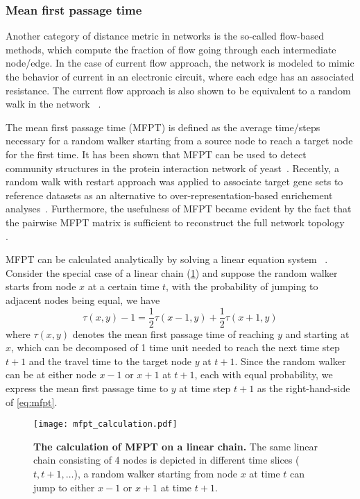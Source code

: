 \subsubsection{Mean first passage time}
Another category of distance metric in networks is the 
so-called flow-based methods, which compute the fraction of flow going through each intermediate node/edge. In the case of current flow approach, the network is modeled to mimic the behavior of current in an electronic circuit, where each edge has an associated resistance. The current flow approach is
also shown to be equivalent to a random walk in the network~%
\citep{Doyle2000}.

The mean first passage time (MFPT) is defined as the average time/steps 
necessary for 
a random walker starting from a source node to reach a target node for the
first time. It has been shown that MFPT can be used to detect community
structures in the protein interaction network of yeast~\citep{Zhou2003}. 
Recently, a random walk with restart approach was applied to associate
target gene sets to reference datasets as an alternative to 
over-representation-based enrichement analyses~\citep{Glaab2012}. Furthermore,
the usefulness of MFPT became evident by the fact that the pairwise MFPT 
matrix is sufficient to reconstruct the full network topology~%
\citep{Wittmann2009}.

MFPT can be calculated analytically by solving a linear equation system~%
\citep{Kampen2007}. Consider the special case of a linear chain 
(\ref{fig:mfpt_calculation}) and suppose the random walker starts from node 
$x$ at a certain time $t$, with the probability of jumping to adjacent nodes
being equal, we have
\begin{equation}
\tau(x,y) - 1 = \frac{1}{2}\tau(x-1,y) + \frac{1}{2}\tau(x+1,y)
\label{eq:mfpt}
\end{equation}
where $\tau(x,y)$ denotes the mean first passage time of reaching $y$ and 
starting at $x$, which can be decomposed of 1 time unit needed to reach the
next time step $t+1$ and the travel time to the target node $y$ at $t+1$.
Since the random walker can be at either node $x-1$ or $x+1$ at $t+1$, each
with equal probability, we express the mean first passage time to $y$ at
time step $t+1$ as the right-hand-side of \ref{eq:mfpt}.

\begin{figure}[!ht]
\begin{center}
\texttt{[image: mfpt\_calculation.pdf]}
\end{center}
\caption[MFPT calculation]{
{\bf The calculation of MFPT on a linear chain.}
The same linear chain consisting of 4 nodes is depicted in different time 
slices ($t,t+1,\ldots$), 
a random walker starting from node $x$ at time $t$ can jump to either $x-1$ 
or $x+1$ at time $t+1$.
}
\label{fig:mfpt_calculation}
\end{figure}

